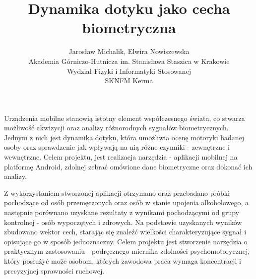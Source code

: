 \documentclass[12pt, a4paper]{article}
\begin{document}
\title{Dynamika dotyku jako cecha biometryczna }
\author{Jarosław Michalik, Elwira Nowiszewska \\Akademia Górniczo-Hutnicza im. Stanisława Staszica w Krakowie\\Wydział Fizyki i Informatyki Stosowanej\\ SKNFM Kerma}
\date {}
\maketitle
\thispagestyle{title}
Urządzenia mobilne stanowią istotny element współczesnego świata, co stwarza możliwość akwizycji oraz analizy różnorodnych sygnałów biometrycznych. 
Jednym z nich jest dynamika dotyku, która umożliwia ocenę motoryki badanej osoby oraz sprawdzenie jak wpływają na nią różne czynniki - zewnętrzne i wewnętrzne. Celem projektu, jest realizacja narzędzia - aplikacji mobilnej na platformę Android, zdolnej zebrać omówione dane biometryczne oraz dokonać ich analizy. 

Z wykorzystaniem stworzonej aplikacji otrzymano oraz przebadano próbki pochodzące od osób przemęczonych oraz osób w stanie upojenia alkoholowego, a następnie porównano uzyskane rezultaty z wynikami pochodzącymi od grupy kontrolnej - osób wypoczętych i zdrowych. Na podstawie uzyskanych wyników zbudowano wektor cech, starając się znaleźć wielkości charakteryzujące sygnał i opisujące go w sposób jednoznaczny. Celem projektu jest stworzenie narzędzia o praktycznym zastosowaniu - podręcznego miernika zdolności psychomotorycznej, który posłużyć może osobom, których zawodowa praca wymaga koncentracji i precyzyjnej sprawności ruchowej.
\end{document}
